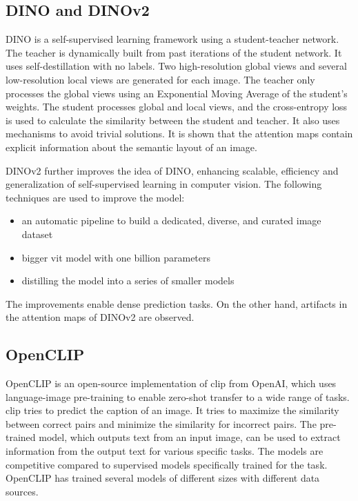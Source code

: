 \documentclass[conference]{IEEEtran}
\begin{document}
  \subsection{\mbox{DINO} and \mbox{DINOv2}}
  \label{sec:dino-dinov2}

  \mbox{DINO} is a self-supervised learning framework using a student-teacher network. The teacher is dynamically built from past iterations of the student network. It uses self-destillation with no labels. Two high-resolution global views and several low-resolution local views are generated for each image. The teacher only processes the global views using an Exponential Moving Average of the student's weights. The student processes global and local views, and the cross-entropy loss is used to calculate the similarity between the student and teacher. It also uses mechanisms to avoid trivial solutions. \cite{dino} It is shown that the attention maps contain explicit information about the semantic layout of an image. \cite{registers}

  \mbox{DINOv2} further improves the idea of \mbox{DINO}, enhancing scalable, efficiency and generalization of self-supervised learning in computer vision. The following techniques are used to improve the model:
  \begin{itemize}
    \item  an automatic pipeline to build a dedicated, diverse, and curated image dataset
    \item  bigger \ac{vit} model with one billion parameters
    \item distilling the model into a series of smaller models \cite{dinov2}
  \end{itemize}
  The improvements enable dense prediction tasks. On the other hand, artifacts in the attention maps of \mbox{DINOv2} are observed. \cite{registers}
  
  \subsection{OpenCLIP}
  \label{sec:openclip}
  
  \mbox{OpenCLIP} is an open-source implementation of \ac{clip} \cite{clip} from OpenAI, which uses language-image pre-training to enable zero-shot transfer to a wide range of tasks. \ac{clip} tries to predict the caption of an image. It tries to maximize the similarity between correct pairs and minimize the similarity for incorrect pairs. The pre-trained model, which outputs text from an input image, can be used to extract information from the output text for various specific tasks. The models are competitive compared to supervised models specifically trained for the task. \cite{clip}
  \mbox{OpenCLIP} has trained several models of different sizes with different data sources. \cite{open-clip} 
\end{document}
